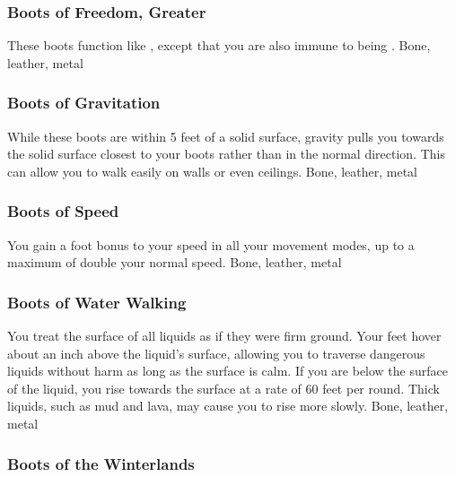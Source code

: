 \hypertarget{item:Boots of Freedom, Greater}{\subsubsection{Boots of Freedom, Greater\hfill{}}}
These boots function like , except that you are also immune to being \grappled.
 
 Bone, leather, metal
\lowercase{\hypertarget{item:Boots of Gravitation}{}}\label{item:Boots of Gravitation}
\hypertarget{item:Boots of Gravitation}{\subsubsection{Boots of Gravitation\hfill{}}}
While these boots are within 5 feet of a solid surface, gravity pulls you towards the solid surface closest to your boots rather than in the normal direction.
This can allow you to walk easily on walls or even ceilings.
 
 Bone, leather, metal
\lowercase{\hypertarget{item:Boots of Speed}{}}\label{item:Boots of Speed}
\hypertarget{item:Boots of Speed}{\subsubsection{Boots of Speed\hfill{}}}
You gain a  foot bonus to your speed in all your movement modes, up to a maximum of double your normal speed.
 
 Bone, leather, metal
\lowercase{\hypertarget{item:Boots of Water Walking}{}}\label{item:Boots of Water Walking}
\hypertarget{item:Boots of Water Walking}{\subsubsection{Boots of Water Walking\hfill{}}}
You treat the surface of all liquids as if they were firm ground.
Your feet hover about an inch above the liquid's surface, allowing you to traverse dangerous liquids without harm as long as the surface is calm.
If you are below the surface of the liquid, you rise towards the surface at a rate of 60 feet per round.
Thick liquids, such as mud and lava, may cause you to rise more slowly.
 
 Bone, leather, metal
\lowercase{\hypertarget{item:Boots of the Winterlands}{}}\label{item:Boots of the Winterlands}
\hypertarget{item:Boots of the Winterlands}{\subsubsection{Boots of the Winterlands\hfill{}}}
